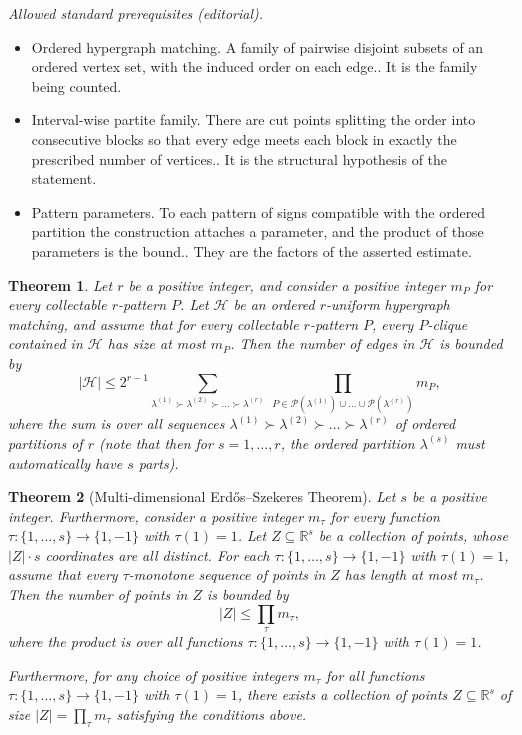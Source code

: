 \documentclass[10pt,a4paper]{article}
\newtheorem{theorem}{Theorem}[section]
\theoremstyle{definition}
\newcommand{\su}{\subseteq}
\newcommand{\HH}{\mathcal{H}}
\newcommand{\PP}{\mathcal{P}}
\begin{document}
\noindent\textit{Allowed standard prerequisites (editorial).}\begin{itemize}
\item Ordered hypergraph matching. A family of pairwise disjoint subsets of an ordered vertex set, with the induced order on each edge.. It is the family being counted.
\item Interval-wise partite family. There are cut points splitting the order into consecutive blocks so that every edge meets each block in exactly the prescribed number of vertices.. It is the structural hypothesis of the statement.
\item Pattern parameters. To each pattern of signs compatible with the ordered partition the construction attaches a parameter, and the product of those parameters is the bound.. They are the factors of the asserted estimate.
\end{itemize}\medskip
\begin{theorem} \label{thm-paramteters-upper-bound}
Let $r$ be a positive integer, and consider a positive integer $m_P$ for every collectable $r$-pattern $P$. Let $\HH$ be an ordered $r$-uniform hypergraph matching, and assume that for every collectable $r$-pattern $P$, every $P$-clique contained in $\HH$ has size at most $m_P$. Then the number of edges in $\HH$ is bounded by
\begin{equation}\label{eq_main_upper}
|\HH|\le 2^{r-1} \sum_{\lambda^{(1)} \succ \lambda^{(2)} \succ \dots \succ \lambda^{(r)}}\ \prod_{P\in \PP(\lambda^{(1)})\cup\dots\cup \PP(\lambda^{(r)})} m_{P},
\end{equation}
where the sum is over all sequences $\lambda^{(1)} \succ \lambda^{(2)} \succ \dots \succ \lambda^{(r)}$ of ordered partitions of $r$ (note that then for $s=1,\dots,r$, the ordered partition $\lambda^{(s)}$ must automatically have $s$ parts).
\end{theorem}

\label{sect-preliminaries}

\begin{theorem}[Multi-dimensional Erd\H{o}s--Szekeres Theorem]\label{thm_es}
Let $s$ be a positive integer. Furthermore, consider a positive integer $m_\tau$ for every function $\tau:\{1,\dots,s\}\to \{1,-1\}$ with $\tau(1)=1$. Let $Z\su \mathbb{R}^s$ be a collection of points, whose $|Z|\cdot s$ coordinates are all distinct. For each $\tau:\{1,\dots,s\}\to \{1,-1\}$ with $\tau(1)=1$, assume that every $\tau$-monotone sequence of points in $Z$ has length at most $m_\tau$. Then the number of points in $Z$ is bounded by
\[|Z|\le \prod_{\tau} m_{\tau},\]
where the product is over all functions $\tau:\{1,\dots,s\}\to \{1,-1\}$ with $\tau(1)=1$.

Furthermore, for any choice of positive integers $m_\tau$ for all functions $\tau:\{1,\dots,s\}\to \{1,-1\}$ with $\tau(1)=1$, there exists a collection of points $Z\su \mathbb{R}^s$ of size $|Z|=\prod_\tau m_\tau$ satisfying the conditions above.
\end{theorem}
\end{document}
